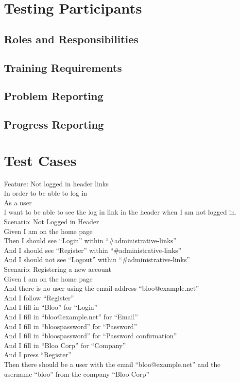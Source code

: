 \documentclass[12pt]{article}
\begin{document}
\section{Testing Participants}
\subsection{Roles and Responsibilities}
\subsection{Training Requirements}
\subsection{Problem Reporting}
\subsection{Progress Reporting}

\section{Test Cases}

Feature: Not logged in header links \\
  In order to be able to log in \\
  As a user \\
  I want to be able to see the log in link in the header when I am not logged in. \\

Scenario: Not Logged in Header  \\
  Given I am on the home page \\
  Then I should see ``Login'' within ``\#administrative-links'' \\
  And I should see ``Register'' within ``\#administrative-links'' \\
  And I should not see ``Logout'' within ``\#administrative-links'' \\

Scenario: Registering a new account \\
  Given I am on the home page \\
  And there is no user using the email address ``bloo@example.net'' \\
  And I follow ``Register'' \\
  And I fill in ``Bloo'' for ``Login'' \\
  And I fill in ``bloo@example.net'' for ``Email'' \\
  And I fill in ``bloospassword'' for ``Password'' \\
  And I fill in ``bloospassword'' for ``Password confirmation'' \\
  And I fill in ``Bloo Corp'' for ``Company'' \\
  And I press ``Register'' \\
  Then there should be a user with the email ``bloo@example.net'' and the username ``bloo'' from the company ``Bloo Corp'' \\
\end{document}
